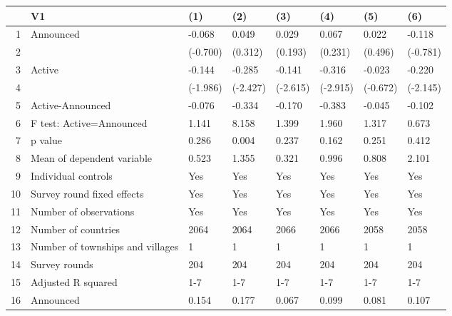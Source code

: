 \begin{table}[ht]
\centering
\begin{tabular}{rlllllll}
  \hline
 & V1 & (1) & (2) & (3) & (4) & (5) & (6) \\ 
  \hline
1 & Announced & -0.068 & 0.049 & 0.029 & 0.067 & 0.022 & -0.118 \\ 
  2 &  & (-0.700) & (0.312) & (0.193) & (0.231) & (0.496) & (-0.781) \\ 
  3 & Active & -0.144 & -0.285 & -0.141 & -0.316 & -0.023 & -0.220 \\ 
  4 &  & (-1.986) & (-2.427) & (-2.615) & (-2.915) & (-0.672) & (-2.145) \\ 
  5 & Active-Announced & -0.076 & -0.334 & -0.170 & -0.383 & -0.045 & -0.102 \\ 
  6 & F test: Active=Announced & 1.141 & 8.158 & 1.399 & 1.960 & 1.317 & 0.673 \\ 
  7 & p value & 0.286 & 0.004 & 0.237 & 0.162 & 0.251 & 0.412 \\ 
  8 & Mean of dependent variable & 0.523 & 1.355 & 0.321 & 0.996 & 0.808 & 2.101 \\ 
  9 & Individual controls & Yes & Yes & Yes & Yes & Yes & Yes \\ 
  10 & Survey round fixed effects & Yes & Yes & Yes & Yes & Yes & Yes \\ 
  11 & Number of observations & Yes & Yes & Yes & Yes & Yes & Yes \\ 
  12 & Number of countries & 2064 & 2064 & 2066 & 2066 & 2058 & 2058 \\ 
  13 & Number of townships and villages & 1 & 1 & 1 & 1 & 1 & 1 \\ 
  14 & Survey rounds & 204 & 204 & 204 & 204 & 204 & 204 \\ 
  15 & Adjusted R squared & 1-7 & 1-7 & 1-7 & 1-7 & 1-7 & 1-7 \\ 
  16 & Announced & 0.154 & 0.177 & 0.067 & 0.099 & 0.081 & 0.107 \\ 
   \hline
\end{tabular}
\end{table}
